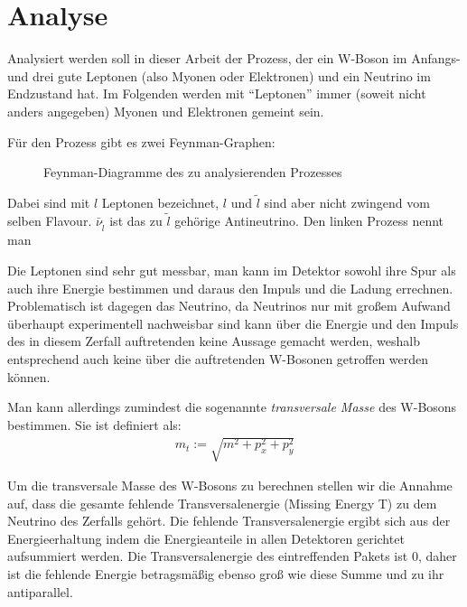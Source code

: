 \section{Analyse}
Analysiert werden soll in dieser Arbeit der Prozess, der ein W-Boson im Anfangs-
und drei gute Leptonen (also Myonen oder Elektronen) und ein Neutrino im
Endzustand hat. Im Folgenden werden mit "`Leptonen"' immer (soweit nicht anders
angegeben) Myonen und Elektronen gemeint sein.

Für den Prozess gibt es zwei Feynman-Graphen:
\begin{figure}[h!]
  \begin{minipage}{0.49\textwidth}
    \centering
    
  \end{minipage}
  \begin{minipage}{0.49\textwidth}
    \centering
    
  \end{minipage}
  \caption{Feynman-Diagramme des zu analysierenden Prozesses}
  \label{fig:feynman}
\end{figure}
Dabei sind mit $l$ Leptonen bezeichnet, $l$ und $\tilde l$ sind aber nicht
zwingend vom selben Flavour. $\bar \nu_{\tilde l}$ ist das zu $\tilde l$
gehörige Antineutrino. Den linken Prozess nennt man 

Die Leptonen sind sehr gut messbar, man kann im Detektor sowohl ihre Spur als
auch ihre Energie bestimmen und daraus den Impuls und die Ladung errechnen.
Problematisch ist dagegen das Neutrino, da Neutrinos nur mit großem Aufwand
überhaupt experimentell nachweisbar sind\cite{needed} kann über die Energie und
den Impuls des in diesem Zerfall auftretenden keine Aussage gemacht werden,
weshalb entsprechend auch keine über die auftretenden W-Bosonen getroffen werden
können.

\label{cha:met}
Man kann allerdings zumindest die sogenannte \emph{transversale Masse} des
W-Bosons bestimmen. Sie ist definiert als:
\begin{align}
  m_t := \sqrt{m^2 + p_x^2 + p_y^2}
  \label{def:trans}
\end{align}

Um die transversale Masse des W-Bosons zu berechnen stellen wir die Annahme auf,
dass die gesamte fehlende Transversalenergie (Missing Energy T) zu dem Neutrino
des Zerfalls gehört. Die fehlende Transversalenergie ergibt sich aus der
Energieerhaltung indem die Energieanteile in allen Detektoren gerichtet aufsummiert
werden. Die Transversalenergie des eintreffenden Pakets ist $0$, daher ist die
fehlende Energie betragsmäßig ebenso groß wie diese Summe und zu ihr
antiparallel.

